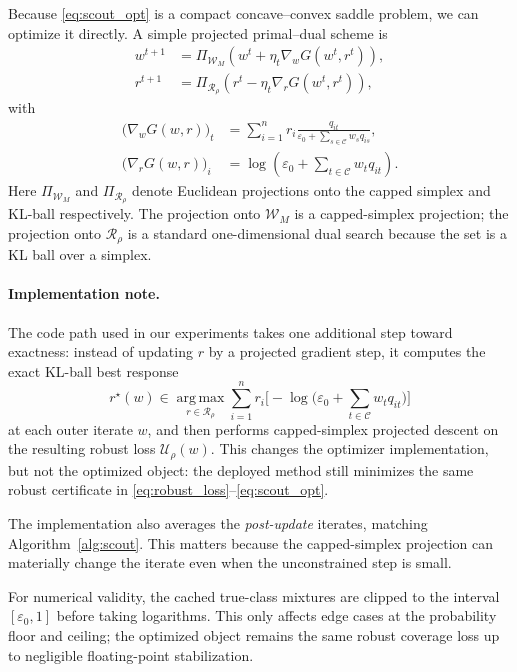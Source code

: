 \documentclass{article}
\newcommand{\cC}{\mathcal{C}}
\newcommand{\cR}{\mathcal{R}}
\newcommand{\cW}{\mathcal{W}}
\newcommand{\argmax}{\operatorname*{arg\,max}}
\newcommand{\eps}{\varepsilon}
\begin{document}
Because \eqref{eq:scout_opt} is a compact concave--convex saddle problem, we can optimize it directly. A simple projected primal--dual scheme is
\begin{align}
    w^{t+1}
    &=
    \Pi_{\cW_M}
    \left(
        w^t + \eta_t \nabla_w G(w^t,r^t)
    \right),
    \label{eq:w_update}
    \\
    r^{t+1}
    &=
    \Pi_{\cR_\rho}
    \left(
        r^t - \eta_t \nabla_r G(w^t,r^t)
    \right),
    \label{eq:r_update}
\end{align}
with
\begin{align}
    \big(\nabla_w G(w,r)\big)_t
    &=
    \sum_{i=1}^{n} r_i
    \frac{q_{it}}{\eps_0 + \sum_{s\in\cC} w_s q_{is}},
    \label{eq:w_grad}
    \\
    \big(\nabla_r G(w,r)\big)_i
    &=
    \log\!\left(
        \eps_0 + \sum_{t\in\cC} w_t q_{it}
    \right).
    \label{eq:r_grad}
\end{align}
Here \(\Pi_{\cW_M}\) and \(\Pi_{\cR_\rho}\) denote Euclidean projections onto the capped simplex and KL-ball respectively. The projection onto \(\cW_M\) is a capped-simplex projection; the projection onto \(\cR_\rho\) is a standard one-dimensional dual search because the set is a KL ball over a simplex.

\paragraph{Implementation note.}
The code path used in our experiments takes one additional step toward exactness: instead of updating \(r\) by a projected gradient step, it computes the exact KL-ball best response
\[
    r^\star(w)
    \in
    \argmax_{r\in\cR_\rho}
    \sum_{i=1}^{n} r_i
    \Big[
        -\log\!\big(
            \eps_0 + \sum_{t\in\cC} w_t q_{it}
        \big)
    \Big]
\]
at each outer iterate \(w\), and then performs capped-simplex projected descent on the resulting robust loss \(\mathcal{U}_\rho(w)\). This changes the optimizer implementation, but not the optimized object: the deployed method still minimizes the same robust certificate in \eqref{eq:robust_loss}--\eqref{eq:scout_opt}.

The implementation also averages the \emph{post-update} iterates, matching Algorithm~\ref{alg:scout}. This matters because the capped-simplex projection can materially change the iterate even when the unconstrained step is small.

For numerical validity, the cached true-class mixtures are clipped to the interval \([\eps_0,1]\) before taking logarithms. This only affects edge cases at the probability floor and ceiling; the optimized object remains the same robust coverage loss up to negligible floating-point stabilization.
\end{document}
